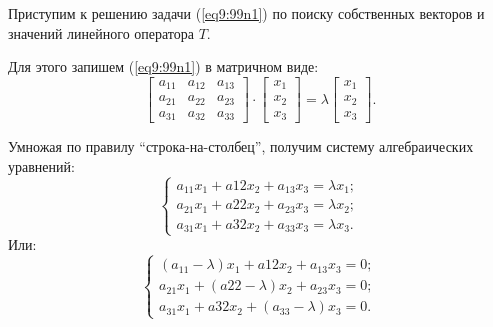 	\begin{comment}
	\textbf{В физике}:
	
	Если кристалл (или другая среда) изотропен, то закон Ома записывется в виде:
	\[ \vec{j} = \lambda\vec{E}, \]
	где \( \lambda \in \Re \) -- проводимость среды. Так как \( \lambda \) -- скаляр, то \( \vec{j} \uparrow\uparrow \vec{E} \). %
	
	Если же кристалл анизотропен, то:
	\[ \vec{j} = \Lambda\vec{E}, \]
	где \( \Lambda = [\lambda_{ij}] \) -- тензор проводимости. Следовательно, \( \vec{j} \uparrow\downarrow \vec{E} \). %
	
	Но существуют такие направления поля \( \vec{E} \), для которых \( \vec{j} \uparrow\uparrow \vec{E} \), то есть появляется задача поиска таких направлений \( \vec{E} \), для которых \( \Lambda\vec{E} = \lambda\vec{E} \).
	\end{comment}
	
	Приступим к решению задачи (\ref{eq9:99n1}) по поиску собственных векторов и значений линейного оператора \( T \).
	
	Для этого запишем (\ref{eq9:99n1}) в матричном виде:
	\[ \begin{bmatrix}
			a_{11} & a_{12} & a_{13} \\
			a_{21} & a_{22} & a_{23} \\
			a_{31} & a_{32} & a_{33}
	\end{bmatrix}\cdot\begin{bmatrix}
			x_1 \\
			x_2 \\
			x_3
	\end{bmatrix} = \lambda \begin{bmatrix}
			x_1 \\
			x_2 \\
			x_3
	\end{bmatrix}. \]
	
	Умножая по правилу ``строка-на-столбец'', получим систему алгебраических уравнений:
	\[ \left\{ \begin{array}{l}
 		a_{11}x_1 + a{12}x_2 + a_{13}x_3 = \lambda x_1; \\
 		a_{21}x_1 + a{22}x_2 + a_{23}x_3 = \lambda x_2; \\
 		a_{31}x_1 + a{32}x_2 + a_{33}x_3 = \lambda x_3.
  	\end{array} \right. \]
	Или:
	\begin{equation} \left\{ \begin{array}{l}
 		(a_{11} - \lambda)x_1 + a{12}x_2 + a_{13}x_3 = 0; \\
 		a_{21}x_1 + (a{22} - \lambda)x_2 + a_{23}x_3 = 0; \\
 		a_{31}x_1 + a{32}x_2 + (a_{33} - \lambda)x_3 = 0.
  	\end{array} \right. \label{eq9:99n2} \end{equation}
	 
